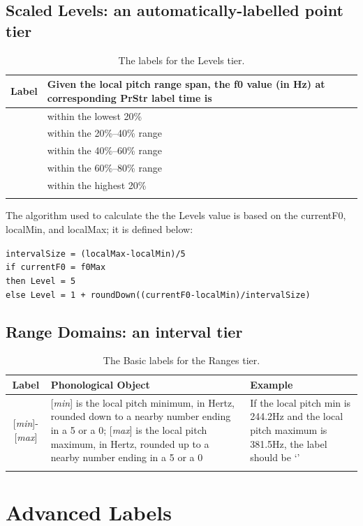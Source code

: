 \documentclass[11pt, twoside]{memoir}
\def\polar#1{{\relsize{-.5}\fontspec[Mapping=tex-text]{Roboto Mono}{#1}}}
\def\polarquot#1{‘\polar{#1}’}
\begin{document}
\subsection*{Scaled Levels: an automatically-labelled point tier}
\begin{longtable}{cp{.8\linewidth}} \toprule
\textbf{Label} & \textbf{Given the local pitch range span, the f0 value (in Hz) at corresponding PrStr label time is} \tabularnewline
\midrule \endhead
\polar{1} & within the lowest 20\% \tabularnewline
\polar{2} & within the 20\%--40\% range \tabularnewline
\polar{3} & within the 40\%--60\% range \tabularnewline
\polar{4} & within the 60\%--80\% range \tabularnewline
\polar{5} & within the highest 20\% \tabularnewline
\bottomrule 
\caption{The labels for the Levels tier.%
}
\end{longtable}

The algorithm used to calculate the the Levels value is based on the currentF0, localMin, and localMax; it is defined below:
\begin{center}
\parbox{.75\linewidth}{
\texttt{intervalSize = (localMax-localMin)/5}\\
\texttt{if currentF0 = f0Max}\\
	\hspace*{1ex}\texttt{then Level = 5}\\
	\hspace*{1ex}\texttt{else Level = 1 + roundDown((currentF0-localMin)/intervalSize)}}
\end{center}


\subsection*{Range Domains: an interval tier}
\begin{longtable}{cp{.46\linewidth}p{.32\linewidth}} \toprule \textbf{Label} & \textbf{Phonological Object} & \textbf{Example}\tabularnewline
\midrule \endhead
{[\textit{min}]-[\textit{max}]} &
	{[\textit{min}] is the local pitch minimum, in Hertz, rounded down to a nearby number ending in a 5 or a 0}; {[\textit{max}] is the local pitch maximum, in Hertz, rounded up to a nearby number ending in a 5 or a 0} &
	If the local pitch min is 244.2Hz and the local pitch maximum is 381.5Hz, the label should be \polarquot{240-385}
	\tabularnewline
\bottomrule 
\caption{The Basic labels for the Ranges tier.}
\end{longtable}


\section*{Advanced Labels}
\end{document}
